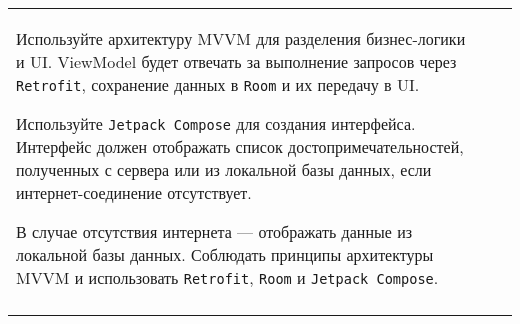 \documentclass[a4paper]{article}
\begin{document}
\begin{tabular}{!{\vrule width 2pt}p{5cm}|p{6cm}|p{4cm}!{\vrule width 2pt}}
{\begin{minipage}{16cm}
\begin{enumerate}
Используйте архитектуру MVVM для разделения бизнес-логики и UI. ViewModel будет отвечать за выполнение запросов через \texttt{Retrofit}, сохранение данных в \texttt{Room} и их передачу в UI.


Используйте \texttt{Jetpack Compose} для создания интерфейса. Интерфейс должен отображать список достопримечательностей, полученных с сервера или из локальной базы данных, если интернет-соединение отсутствует.


В случае отсутствия интернета — отображать данные из локальной базы данных.
Соблюдать принципы архитектуры MVVM и использовать \texttt{Retrofit}, \texttt{Room} и \texttt{Jetpack Compose}. 
\end{enumerate}

\vspace{0.2cm}
    
\end{minipage}
}
\\
\end{tabular}

\newpage
\end{document}
